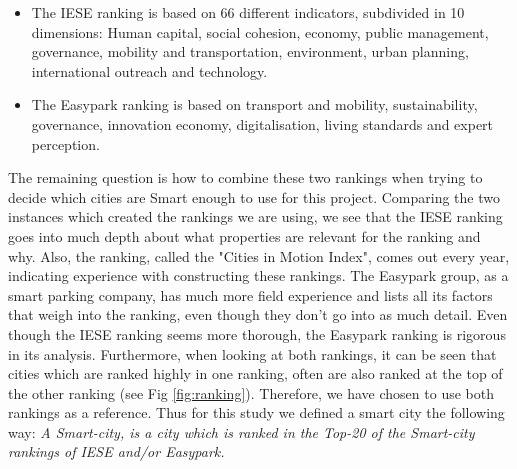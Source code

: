 \documentclass[a4paper, 10pt]{IEEEconf}      %
\begin{document}
\begin{itemize}
\item The IESE ranking is based on 66 different indicators, subdivided in 10 dimensions:
Human capital, social cohesion, economy, public management, governance, mobility and transportation, environment, urban planning, international outreach and technology.
\item The Easypark ranking is based on transport and mobility, sustainability, governance, innovation economy, digitalisation, living standards and expert perception.
\end{itemize}

The remaining question is how to combine these two rankings when trying to decide which cities are Smart enough to use for this project. 
Comparing the two instances which created the rankings we are using, we see that the IESE ranking goes into much depth about what properties are relevant for the ranking and why. Also, the ranking, called the "Cities in Motion Index", comes out every year, indicating experience with constructing these rankings. The Easypark group, as a smart parking company, 
has much more field experience and lists all its factors that weigh into the ranking, even though they don't go into as much detail. Even though the IESE ranking seems more thorough, the Easypark ranking is rigorous in its analysis. Furthermore, when looking at both rankings, it can be seen that cities which are ranked highly in one ranking,
often are also ranked at the top of the other ranking (see Fig \ref{fig:ranking}). Therefore, we have chosen to use both rankings as a reference.
Thus for this study we defined a smart city the following way: \newline
\textit{A Smart-city, is a city which is ranked in the Top-20 of the Smart-city rankings of IESE and/or Easypark.}
\end{document}
